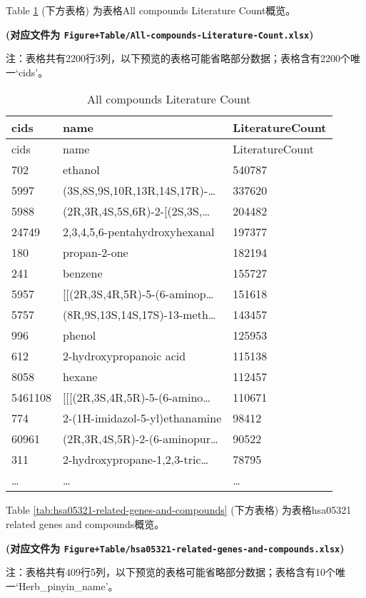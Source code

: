 \documentclass[
]{article}
\begin{document}
Table \ref{tab:All-compounds-Literature-Count} (下方表格) 为表格All compounds Literature Count概览。

\textbf{(对应文件为 \texttt{Figure+Table/All-compounds-Literature-Count.xlsx})}

\begin{center}\begin{tcolorbox}[colback=gray!10, colframe=gray!50, width=0.9\linewidth, arc=1mm, boxrule=0.5pt]注：表格共有2200行3列，以下预览的表格可能省略部分数据；表格含有2200个唯一`cids'。
\end{tcolorbox}
\end{center}

\begin{longtable}[]{@{}lll@{}}
\caption{\label{tab:All-compounds-Literature-Count}All compounds Literature Count}\tabularnewline
\toprule
cids & name & LiteratureCount\tabularnewline
\midrule
\endfirsthead
\toprule
cids & name & LiteratureCount\tabularnewline
\midrule
\endhead
702 & ethanol & 540787\tabularnewline
5997 & (3S,8S,9S,10R,13R,14S,17R)-\ldots{} & 337620\tabularnewline
5988 & (2R,3R,4S,5S,6R)-2-{[}(2S,3S,\ldots{} & 204482\tabularnewline
24749 & 2,3,4,5,6-pentahydroxyhexanal & 197377\tabularnewline
180 & propan-2-one & 182194\tabularnewline
241 & benzene & 155727\tabularnewline
5957 & {[}{[}(2R,3S,4R,5R)-5-(6-aminop\ldots{} & 151618\tabularnewline
5757 & (8R,9S,13S,14S,17S)-13-meth\ldots{} & 143457\tabularnewline
996 & phenol & 125953\tabularnewline
612 & 2-hydroxypropanoic acid & 115138\tabularnewline
8058 & hexane & 112457\tabularnewline
5461108 & {[}{[}{[}(2R,3S,4R,5R)-5-(6-amino\ldots{} & 110671\tabularnewline
774 & 2-(1H-imidazol-5-yl)ethanamine & 98412\tabularnewline
60961 & (2R,3R,4S,5R)-2-(6-aminopur\ldots{} & 90522\tabularnewline
311 & 2-hydroxypropane-1,2,3-tric\ldots{} & 78795\tabularnewline
\ldots{} & \ldots{} & \ldots{}\tabularnewline
\bottomrule
\end{longtable}

Table \ref{tab:hsa05321-related-genes-and-compounds} (下方表格) 为表格hsa05321 related genes and compounds概览。

\textbf{(对应文件为 \texttt{Figure+Table/hsa05321-related-genes-and-compounds.xlsx})}

\begin{center}\begin{tcolorbox}[colback=gray!10, colframe=gray!50, width=0.9\linewidth, arc=1mm, boxrule=0.5pt]注：表格共有409行5列，以下预览的表格可能省略部分数据；表格含有10个唯一`Herb\_pinyin\_name'。
\end{tcolorbox}
\end{center}
\end{document}
